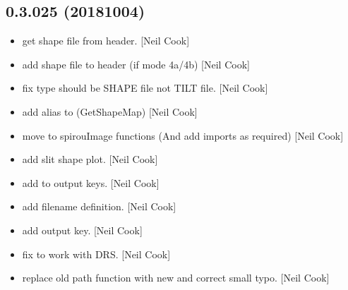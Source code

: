 \documentclass[a4paper,10pt,english]{report}
\begin{document}
\subsection{0.3.025 (2018\sphinxhyphen{}10\sphinxhyphen{}04)}
\label{\detokenize{misc/changelog:id325}}\begin{itemize}
\item {} 
 \sphinxhyphen{} get shape file from header. {[}Neil Cook{]}

\item {} 
 \sphinxhyphen{} add shape file to header (if mode 4a/4b)
{[}Neil Cook{]}

\item {} 
 \sphinxhyphen{} fix type \sphinxhyphen{} should be SHAPE file not TILT file.
{[}Neil Cook{]}

\item {} 
 \sphinxhyphen{} add alias to  (GetShapeMap)
{[}Neil Cook{]}

\item {} 
 \sphinxhyphen{} move  to spirouImage functions (And add
imports as required) {[}Neil Cook{]}

\item {} 
 \sphinxhyphen{} add slit shape plot. {[}Neil Cook{]}

\item {} 
 \sphinxhyphen{} add  to output keys. {[}Neil Cook{]}

\item {} 
 \sphinxhyphen{} add  filename definition. {[}Neil Cook{]}

\item {} 
 \sphinxhyphen{} add  output key. {[}Neil Cook{]}

\item {} 
 \sphinxhyphen{} fix to work with DRS. {[}Neil Cook{]}

\item {} 
 \sphinxhyphen{} replace old path function with new and correct
small typo. {[}Neil Cook{]}


\end{itemize}
\end{document}
